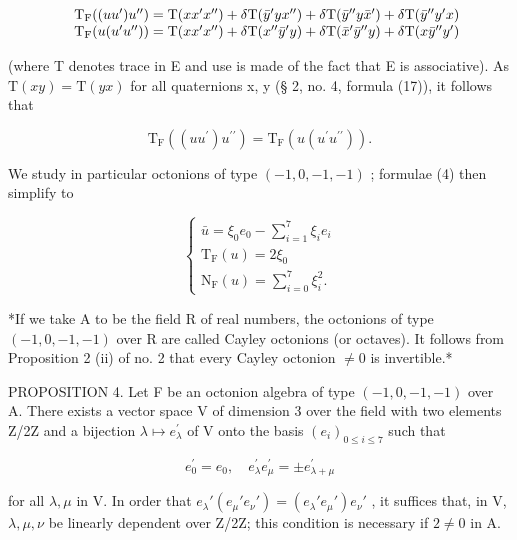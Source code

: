 \[
\begin{array}{r l} & {\mathrm{T} _ {\mathrm{F}} ((u u ^ {\prime}) u ^ {\prime \prime}) = \mathrm{T} (x x ^ {\prime} x ^ {\prime \prime}) + \delta \mathrm{T} (\bar {y} ^ {\prime} y x ^ {\prime \prime}) + \delta \mathrm{T} (\bar {y} ^ {\prime \prime} y \bar {x} ^ {\prime}) + \delta \mathrm{T} (\bar {y} ^ {\prime \prime} y ^ {\prime} x)} \\ & {\mathrm{T} _ {\mathrm{F}} (u (u ^ {\prime} u ^ {\prime \prime})) = \mathrm{T} (x x ^ {\prime} x ^ {\prime \prime}) + \delta \mathrm{T} (x ^ {\prime \prime} \bar {y} ^ {\prime} y) + \delta \mathrm{T} (\bar {x} ^ {\prime} \bar {y} ^ {\prime \prime} y) + \delta \mathrm{T} (x \bar {y} ^ {\prime \prime} y ^ {\prime})} \end{array}
\]

(where T denotes trace in E and use is made of the fact that E is associative). As \(\mathrm{T}(xy) = \mathrm{T}(yx)\) for all quaternions x, y (§ 2, no. 4, formula (17)), it follows that

\[
\mathrm{T} _ {\mathrm{F}} ((u u ^ {\prime}) u ^ {\prime \prime}) = \mathrm{T} _ {\mathrm{F}} (u (u ^ {\prime} u ^ {\prime \prime})).\tag{5}
\]

We study in particular octonions of type \((-1, 0, -1, -1)\) ; formulae (4) then simplify to

\[
\left\{ \begin{array}{c} {\bar {u}} = \xi_ {0} e _ {0} - \sum_ {i = 1} ^ {7} \xi_ {i} e _ {i} \\ \mathrm{T} _ {\mathrm{F}} (u) = 2 \xi_ {0} \\ \mathrm{N} _ {\mathrm{F}} (u) = \sum_ {i = 0} ^ {7} \xi_ {i} ^ {2}. \end{array} \right.\tag{6}
\]

*If we take A to be the field R of real numbers, the octonions of type \((-1,0,-1,-1)\) over R are called Cayley octonions (or octaves). It follows from Proposition 2 (ii) of no. 2 that every Cayley octonion \(\neq0\) is invertible.*

PROPOSITION 4. Let F be an octonion algebra of type \((-1,0,-1,-1)\) over A. There exists a vector space V of dimension 3 over the field with two elements Z/2Z and a bijection \(\lambda\mapsto e_{\lambda}^{\prime}\) of V onto the basis \((e_{i})_{0\leq i\leq7}\) such that

\[
e _ {0} ^ {\prime} = e _ {0}, \quad e _ {\lambda} ^ {\prime} e _ {\mu} ^ {\prime} = \pm e _ {\lambda + \mu} ^ {\prime}\tag{7}
\]

for all \(\lambda, \mu\) in V. In order that \(e_{\lambda}'(e_{\mu}'e_{\nu}') = (e_{\lambda}'e_{\mu}')e_{\nu}'\) , it suffices that, in V, \(\lambda, \mu, \nu\) be linearly dependent over Z/2Z; this condition is necessary if \(2 \neq 0\) in A.

